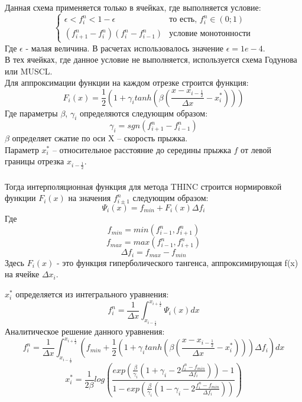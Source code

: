 \documentclass[12pt,a4paper]{article}
\begin{document}
Данная схема применяется только в ячейках, где выполняется условие:
\[
\begin{cases}
\epsilon<f_i^n<1-\epsilon & \text{то есть, }f_i^n\in(0; 1)
\\
(f_{i+1}^n-f_i^n)(f_i^n-f_{i-1}^n) & \text{условие монотонности}
\end{cases}
\]
Где $\epsilon$ - малая величина. В расчетах использовалось значение $\epsilon=1e-4$.\\
В тех ячейках, где данное условие не выполняется, используется схема Годунова или MUSCL.\\
Для аппроксимации функции  на каждом  отрезке строится функция:
\[
F_i(x)=\frac{1}{2}(1+\gamma_itanh(\beta(\frac{x-x_{i-\frac{1}{2}}}{\Delta x}-x_i^*)))
\]
Где параметры $\beta$, $\gamma_i$ определяются следующим образом:
\[
\gamma_i=sgn(f_{i+1}^n-f_{i-1}^n)
\]
$\beta$ определяет сжатие по оси X – скорость прыжка.\\
Параметр $x_i^*$ – относительное расстояние до середины прыжка $f$ от левой границы отрезка $x_{i-\frac{1}{2}}$.
\\
\medskip
\\
Тогда интерполяционная функция для метода THINC строится нормировкой функции $F_i(x)$ на значения $f_{i\pm 1}^n$ следующим образом:
\[
\Psi_i(x)=f_{min}+F_i(x)\Delta f_i
\]
Где
\[
f_{min} = min(f_{i-1}^n, f_{i+1}^n)
\]
\[
f_{max} = max(f_{i-1}^n, f_{i+1}^n)
\]    
\[
\Delta f_i=f_{max}-f_{min}
\]
Здесь $F_i(x)$ - это функция гиперболического тангенса, аппроксимирующая f(x) на ячейке $\Delta x_i$.

$x_i^*$ определяется из интегрального уравнения:
\[
f_i^n=\frac{1}{\Delta x}\int_{x_{i-\frac{1}{2}}}^{x_{i+\frac{1}{2}}}\Psi_i(x)dx
\]
Аналитическое решение данного уравнения:
\[
f_i^n=\frac{1}{\Delta x}\int_{x_{i-\frac{1}{2}}}^{x_{i+\frac{1}{2}}}(f_{min}+
\frac{1}{2}(1+\gamma_itanh(\beta(\frac{x-x_{i-\frac{1}{2}}}{\Delta x}-x_i^*)))\Delta f_i)dx
\]
\[
x_i^*=\frac{1}{2\beta}log\left(\frac{exp(\frac{\beta}{\gamma_i}(1+\gamma_i-2\frac{f_i^n-f_{min}}{\Delta f_i}))-1}{1-exp(\frac{\beta}{\gamma_i}(1-\gamma_i-2\frac{f_i^n-f_{min}}{\Delta f_i}))}\right)
\]
\end{document}

